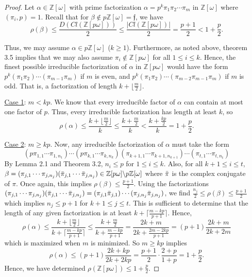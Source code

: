 \documentclass{amsart}
\theoremstyle{definition}
\newcommand{\bbz}{\mathbb{Z}}
\renewcommand{\geq}{\geqslant}
\renewcommand{\leq}{\leqslant}
\numberwithin{equation}{section}
\begin{document}
\begin{proof}
    Let $\alpha \in \bbz[\omega]$ with prime factorization $\alpha = p^k \pi_1 \pi_2 \dotsm \pi_m$ in $\bbz[\omega]$ where $(\pi_i, p) = 1$. Recall that for $\beta \notin p\bbz[\omega] = \mathfrak{f}$, we have 
    \[
    \rho(\beta) \leq \frac{D(Cl(\bbz[p\omega]))}{2} \leq \frac{|Cl(\bbz[p\omega])|}{2}=\frac{p+1}{2} < 1 + \frac{p}{2}.
    \]

    Thus, we may assume $\alpha \in p\bbz[\omega]$ ($k \geq 1$). Furthermore, as noted above, theorem 3.5 implies that we may also assume $\pi_i \notin \bbz[p\omega]$ for all $1 \leq i \leq k$. Hence, the finest possible irreducible factorization of $\alpha$ in $\bbz[p\omega]$ would have the form $p^k(\pi_1 \pi_2) \dotsm (\pi_{m-1}\pi_m)$ if $m$ is even, and $p^k(\pi_1 \pi_2) \dotsm (\pi_{m-2} \pi_{m-1}\pi_m)$ if $m$ is odd. That is, a factorization of length $k + \lfloor \frac{m}{2} \rfloor$.

    \underline{Case 1}: $m < kp$. We know that every irreducible factor of $\alpha$ can contain at most one factor of $p$. Thus, every irreducible factorization has length at least $k$, so 
    \[
    \rho(\alpha) \leq \frac{k + \lfloor \frac{m}{2} \rfloor}{k} \leq \frac{k + \frac{m}{2}}{k} < \frac{k + \frac{kp}{2}}{k} = 1 + \frac{p}{2}.
    \]
    
    \underline{Case 2}: $m \geq kp$. Now, any irreducible factorization of $\alpha$ must take the form 
    \[
    (p \pi_{1,1} \dotsm \pi_{1,n_1})\dotsm (p \pi_{k,1} \dotsm \pi_{k,n_k}) ( \pi_{k+1,1} \dotsm \pi_{k+1,n_{k+1}}) \dotsm ( \pi_{t,1} \dotsm \pi_{t,n_t}) 
    \]
    By Lemma 2.1 and Theorem 3.2, $n_i \leq p$ for $1 \leq i \leq k$. Also, for all $k + 1 \leq i \leq t$, $\beta = ( \pi_{j,1} \dotsm \pi_{j,n_{j}}) ( \Bar{\pi}_{j,1} \dotsm \Bar{\pi}_{j,n_j}) \in \bbz[p\omega] \backslash p\bbz[\omega]$ where $\Bar{\pi}$ is the complex conjugate of $\pi$. Once again, this implies $\rho(\beta) \leq \frac{p + 1}{2}$. Using the factorizations $( \pi_{j,1} \dotsm \pi_{j,n_{j}}) ( \Bar{\pi}_{j,1} \dotsm \Bar{\pi}_{j,n_j}) = (\pi_{j,1} \Bar{\pi}_{j,1}) \dotsm (\pi_{j,n_j} \Bar{\pi}_{j,n_j})$, we find $\frac{n_j}{2} \leq \rho(\beta) \leq \frac{p+1}{2}$ which implies $ n_j \leq p + 1$ for $k+1 \leq j \leq t$. This is sufficient to determine that the length of any given factorization is at least $k + \lceil \frac{m-kp}{p+1} \rceil$. Hence,
    \[
    \rho(\alpha) \leq \frac{k + \lfloor \frac{m}{2} \rfloor}{k + \lceil \frac{m-kp}{p+1} \rceil} \leq \frac{k + \frac{m}{2}}{k + \frac{m-kp}{p+1}} = \frac{2k + m}{2k + \frac{2m - 2kp}{p+1}} = (p+1)\frac{2k+m}{2k+2m} 
    \]
     which is maximized when $m$ is minimized. So $m \geq kp$ implies
    \[
    \rho(\alpha) \leq (p+1)\frac{2k+kp}{2k+2kp}=\frac{p+1}{2}\cdot\frac{2+p}{1+p} = 1 + \frac{p}{2}.
    \]
    Hence, we have determined $\rho(\bbz[p\omega]) \leq 1 + \frac{p}{2}$. 
    

\end{proof}
\end{document}
